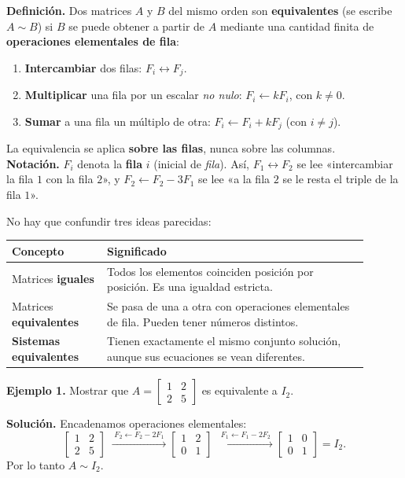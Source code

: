 \documentclass[12pt, letterpaper]{article}
\newcommand{\mwmat}[1]{\ensuremath{\begin{bmatrix}#1\end{bmatrix}}}
\begin{document}
\begin{cuadroteoria}
  \small
  \textbf{Definición.} Dos matrices $A$ y $B$ del mismo orden son
  \textbf{equivalentes} (se escribe $A\sim B$) si $B$ se puede obtener a
  partir de $A$ mediante una cantidad finita de \textbf{operaciones
  elementales de fila}:
  \begin{enumerate}[leftmargin=1.4em, nosep]
    \item \textbf{Intercambiar} dos filas: $F_i\leftrightarrow F_j$.
    \item \textbf{Multiplicar} una fila por un escalar \emph{no nulo}:
          $F_i\leftarrow kF_i$, con $k\neq0$.
    \item \textbf{Sumar} a una fila un múltiplo de otra:
          $F_i\leftarrow F_i+kF_j$ (con $i\neq j$).
  \end{enumerate}
  La equivalencia se aplica \textbf{sobre las filas}, nunca sobre las
  columnas.
  \\[3pt]
  \textbf{Notación.} $F_i$ denota la \textbf{fila} $i$ (inicial de
  \emph{fila}). Así, $F_1\leftrightarrow F_2$ se lee «intercambiar la fila
  $1$ con la fila $2$», y $F_2\leftarrow F_2-3F_1$ se lee «a la fila $2$ se
  le resta el triple de la fila $1$».
\end{cuadroteoria}

No hay que confundir tres ideas parecidas:

\begin{center}
\small
\begin{tabular}{@{}p{0.24\linewidth} p{0.66\linewidth}@{}}
  \toprule
  \textbf{Concepto} & \textbf{Significado} \\
  \midrule
  Matrices \textbf{iguales} & Todos los elementos coinciden posición por
    posición. Es una igualdad estricta. \\
  Matrices \textbf{equivalentes} & Se pasa de una a otra con operaciones
    elementales de fila. Pueden tener números distintos. \\
  \textbf{Sistemas equivalentes} & Tienen exactamente el mismo conjunto
    solución, aunque sus ecuaciones se vean diferentes. \\
  \bottomrule
\end{tabular}
\end{center}

\begin{cuadrosolucion}
  \small
  \textbf{Ejemplo 1.} Mostrar que
  $A=\mwmat{1&2\\2&5}$ es equivalente a $I_2$.

  \medskip
  \textbf{Solución.} Encadenamos operaciones elementales:
  \[
    \mwmat{1&2\\2&5}
    \;\xrightarrow{\;F_2\leftarrow F_2-2F_1\;}
    \mwmat{1&2\\0&1}
    \;\xrightarrow{\;F_1\leftarrow F_1-2F_2\;}
    \mwmat{1&0\\0&1}=I_2.
  \]
  Por lo tanto $A\sim I_2$.
\end{cuadrosolucion}
\end{document}
